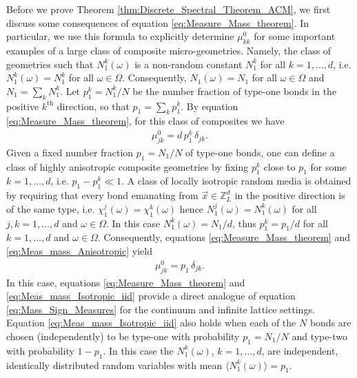 \documentclass{cmslatex}
\begin{document}
Before we prove Theorem \ref{thm:Discrete_Spectral_Theorem_ACM}, we
first discuss some consequences of equation
\eqref{eq:Measure_Mass_theorem}. In particular, we use this
formula to explicitly determine $\mu^0_{kk}$ for some important
examples of a large class of composite micro-geometries. Namely, the
class of geometries such that $N_1^k(\omega)$ is a non-random constant
$N_1^k$ for all $k=1,\ldots,d$, i.e. $N_1^k(\omega)=N_1^k$ for all
$\omega\in\Omega$. Consequently, $N_1(\omega)=N_1$ for all $\omega\in\Omega$ and
$N_1=\sum_kN_1^k$. Let $p_1^k=N_1^k/N$ be the number fraction of type-one
bonds in the positive $k^{\text{th}}$ direction, so that
$p_1=\sum_kp_1^k$. By equation \eqref{eq:Measure_Mass_theorem}, for this
class of composites we have
% 
\begin{align}\label{eq:Meas_mass_Anisotropic}
  \mu_{jk}^0=d\,p_1^k\,\delta_{jk}.
\end{align}
%
Given a fixed number fraction $p_1=N_1/N$ of type-one bonds, one can
define a class of highly anisotropic composite geometries by fixing
$p_1^k$ close to $p_1$ for some $k=1,\ldots,d$,
i.e. $p_1-p_1^k\ll1$. A class of locally isotropic random media is
obtained by requiring that every bond emanating from
$\vec{x}\in\mathbb{Z}^d_L$ in the positive direction is of the same
type, i.e. $\chi_1^j(\omega)=\chi_1^k(\omega)$ hence $N_1^j(\omega)=N_1^k(\omega)$ for all
$j,k=1,\ldots,d$ and $\omega\in\Omega$. In this case $N_1^k(\omega)=N_1/d$, thus
$p_1^k=p_1/d$ for all $k=1,\ldots,d$ and $\omega\in\Omega$. Consequently, equations
\eqref{eq:Measure_Mass_theorem} and \eqref{eq:Meas_mass_Anisotropic}
yield 
%
\begin{align}\label{eq:Meas_mass_Isotropic_iid}
  \mu_{jk}^0=p_1\,\delta_{jk}.
\end{align}
%
In this case, equations \eqref{eq:Measure_Mass_theorem} and
\eqref{eq:Meas_mass_Isotropic_iid} provide a direct
analogue of equation \eqref{eq:Mass_Sign_Measures} for the continuum
and infinite lattice settings.  Equation
\eqref{eq:Meas_mass_Isotropic_iid} also holds when each of the $N$ 
bonds are chosen (independently) to be type-one with probability
$p_1=N_1/N$ and type-two with probability $1-p_1$. In this case the
$N_1^k(\omega)$, $k=1,\ldots,d$, are independent, identically distributed random 
variables with mean $\langle N_1^k(\omega)\rangle=p_1$.
\end{document}
